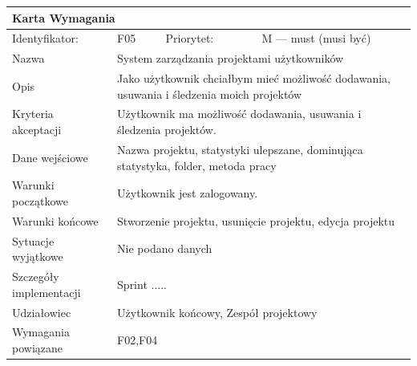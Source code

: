 \documentclass[a4paper,11pt]{report}
\begin{document}
		\begin{tabular}{|p{3cm}|p{2cm}|p{2cm}|p{6cm}|}
		\hline
		\multicolumn{4}{|p{12 cm}|}{Karta Wymagania}\\
		\hline
		Identyfikator: & F05 & Priorytet: & M — must (musi być)\\
		\hline
		Nazwa & \multicolumn{3}{|p{10 cm}|}{System zarządzania projektami użytkowników}\\
		\hline
		Opis & \multicolumn{3}{|p{10 cm}|}{Jako użytkownik chciałbym mieć możliwość dodawania, usuwania i śledzenia moich projektów}\\
		\hline
		Kryteria akceptacji & \multicolumn{3}{|p{10 cm}|}{Użytkownik ma możliwość dodawania, usuwania i śledzenia projektów.}\\
		\hline
		Dane wejściowe & \multicolumn{3}{|p{10 cm}|}{Nazwa projektu, statystyki ulepszane, dominująca statystyka, folder, metoda pracy}\\
		\hline
		Warunki początkowe & \multicolumn{3}{|p{10 cm}|}{Użytkownik jest zalogowany.}\\
		\hline
		Warunki końcowe & \multicolumn{3}{|p{10 cm}|}{Stworzenie projektu, usunięcie projektu, edycja projektu}\\
		\hline
		Sytuacje wyjątkowe & \multicolumn{3}{|p{10 cm}|}{Nie podano danych}\\
		\hline
		Szczegóły implementacji & \multicolumn{3}{|p{10 cm}|}{Sprint .....}\\
		\hline
		Udziałowiec & \multicolumn{3}{|p{10 cm}|}{Użytkownik końcowy, Zespół projektowy}\\
		\hline
		Wymagania powiązane & \multicolumn{3}{|p{10 cm}|}{F02,F04}\\
		\hline
		\end{tabular}\\
		\newline
		\vspace*{0,2 cm}
		\newline
\end{document}
